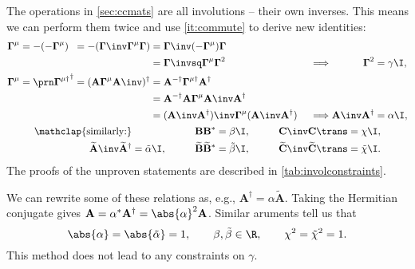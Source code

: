 \documentclass[11pt]{article}
\newcommand{\invd}{^{-\dag}}
\newcommand{\cc}{^\ast}
\newcommand{\hc}{^\dag}
\newcommand{\Gammab}{\boldsymbol{\Gamma}}
\newcommand{\mud}{^{\mu\dag}}
\newcommand{\A}{\mathbf{A}}
\newcommand{\B}{\mathbf{B}}
\renewcommand{\C}{\mathbf{C}}
\newcommand{\At}{\widetilde{\A}}
\newcommand{\Bt}{\widetilde{\B}}
\newcommand{\Ct}{\widetilde{\C}}
\newcommand{\alphat}{\tilde{\alpha}}
\newcommand{\betat}{\tilde{\beta}}
\newcommand{\chit}{\tilde{\chi}}
\begin{document}
The operations in \cref{sec:ccmats} are all involutions -- their own inverses.
This means we can perform them twice and use \cref{it:commute} to derive new identities:
%
\begin{equation*}
\begin{gathered}
\begin{alignedat}{5}
  \Gammab^\mu &= -(-\Gammab^\mu) &
        &= -(\Gammab\inv \Gammab^\mu \Gammab) &
        &= \Gammab\inv (-\Gammab^\mu) \Gammab \\ && &&
        &= \Gammab\invsq \Gammab^\mu \Gammab^2 &\quad
  &\implies &
  \Gammab^2 &= \gamma \I, \\
  \Gammab^\mu &= \Gammap[\mud]\hc &
        &= (\A \Gammab^\mu \A\inv)\hc &
        &= \A\invd \Gammab\mud \A\hc \\ && &&
        &= \A\invd \A \Gammab^\mu \A\inv \A\hc \\ && &&
        &= (\A\inv \A\hc)\inv \Gammab^\mu (\A\inv \A\hc) &
  &\implies &
  \A\inv \A\hc &= \alpha \I,
\end{alignedat} \\
\begin{aligned}
  \mathclap{\text{similarly:}} &&\qquad
  \B \B\cc &= \beta \I, &\qquad
  \C\inv \C\trans &= \chi \I, \\
  \At\inv \At\hc &= \alphat \I, &
  \Bt \Bt\cc &= \betat \I, &
  \Ct\inv \Ct\trans &= \chit \I.
\end{aligned}
\end{gathered}
\end{equation*}
%
The proofs of the unproven statements are described in \cref{tab:involconstraints}.

We can rewrite some of these relations as, e.g., \(\A\hc = \alpha \At\).
Taking the Hermitian conjugate gives \(\A = \alpha\cc \A\hc = \abs{\alpha}^2 \A\).
Similar aruments tell us that
%
\begin{equation}\label{eq:constinvol}
  \abs{\alpha} = \abs{\alphat} = 1, \qquad
  \beta, \betat \in \R, \qquad
  \chi^2 = \chit^2 = 1.
\end{equation}
%
This method does not lead to any constraints on \(\gamma\).
\end{document}
